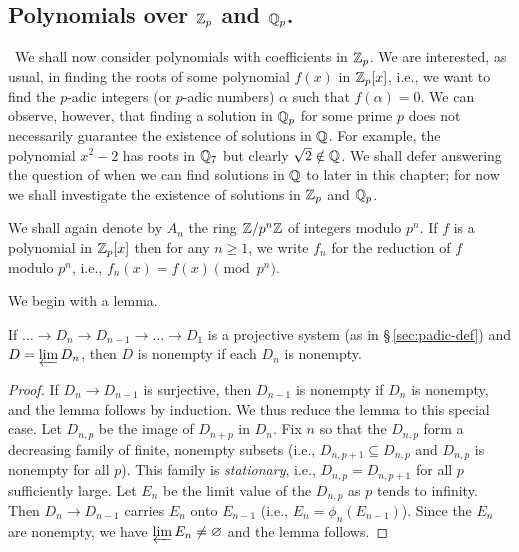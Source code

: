 \subsection{Polynomials over \(\Integers_p\) and \(\Rationals_p\).}~We shall now consider polynomials with coefficients in \(\Integers_p\). We are interested, as usual, in finding the roots of some polynomial \(f(x)\) in \(\Integers_p[x]\), i.e., we want to find the \(p\)-adic integers (or \(p\)-adic numbers) \(\alpha\) such that \(f(\alpha) = 0\). We can observe, however, that finding a solution in \(\Rationals_p\) for some prime \(p\) does not necessarily guarantee the existence of solutions in \(\Rationals\). For example, the polynomial \(x^2 - 2\) has roots in \(\Rationals_7\) but clearly \(\sqrt{2} \notin \Rationals\). We shall defer answering the question of when we can find solutions in \(\Rationals\) to later in this chapter; for now we shall investigate the existence of solutions in \(\Integers_p\) and \(\Rationals_p\).\label{sec:polynomials-over-zp}

We shall again denote by \(A_n\) the ring \(\Integers / p^n \Integers\) of integers modulo \(p^n\). If \(f\) is a polynomial in \(\Integers_p[x]\) then for any \(n \geq 1\), we write \(f_n\) for the reduction of \(f\) modulo \(p^n\), i.e., \(f_n(x) = f(x) \pmod{p^n}\).

We begin with a lemma.

\begin{lemma}
    {\normalfont\cite[p.~13]{serre2012course}}
    If \(\dots \to D_n \to D_{n - 1} \to \dots \to D_1\) is a projective system (as in {\normalfont \S\,\ref{sec:padic-def}}) and \(D = \varprojlim D_n\), then \(D\) is nonempty if each \(D_n\) is nonempty.
\end{lemma}

\begin{proof}
    If \(D_n \to D_{n-1}\) is surjective, then \(D_{n-1}\) is nonempty if \(D_n\) is nonempty, and the lemma follows by induction. We thus reduce the lemma to this special case. Let \(D_{n, p}\) be the image of \(D_{n+p}\) in \(D_n\). Fix \(n\) so that the \(D_{n,p}\) form a decreasing family of finite, nonempty subsets (i.e., \(D_{n,p+1} \subseteq D_{n,p}\) and \(D_{n,p}\) is nonempty for all \(p\)). This family is \emph{stationary}, i.e., \(D_{n,p} = D_{n,p+1}\) for all \(p\) sufficiently large. Let \(E_n\) be the limit value of the \(D_{n,p}\) as \(p\) tends to infinity. Then \(D_n \to D_{n-1}\) carries \(E_n\) onto \(E_{n-1}\) (i.e., \(E_n = \phi_n(E_{n-1})\)). Since the \(E_n\) are nonempty, we have \(\varprojlim E_n \neq \emptyset\) and the lemma follows.
\end{proof}

